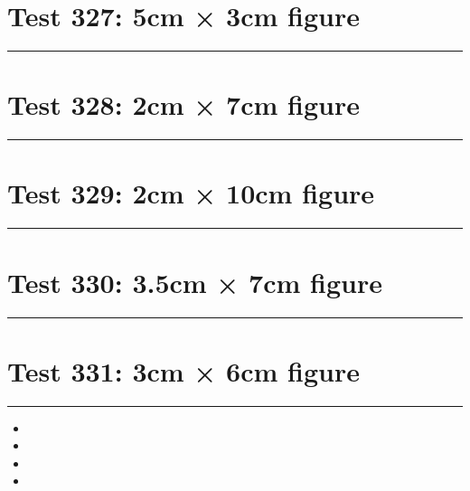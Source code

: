 \documentclass[a4paper,11pt]{article}
\begin{document}
\section*{Test 327: 5cm × 3cm figure}
\begin{swarmwrap}%
  \begin{minipage}[t]{5cm}
    \centering
    \rule{\linewidth}{3cm}
  \end{minipage}%
\end{swarmwrap}%
\swarmwrapnext
\lipsum[112]
\lipsum[113]
\lipsum[114]
\section*{Test 328: 2cm × 7cm figure}
\begin{swarmwrap}%
  \begin{minipage}[t]{2cm}
    \centering
    \rule{\linewidth}{7cm}
  \end{minipage}%
\end{swarmwrap}%
\swarmwrapnext
\lipsum[144]
\lipsum[145]
\lipsum[146]
\lipsum[147]
\section*{Test 329: 2cm × 10cm figure}
\begin{swarmwrap}%
  \begin{minipage}[t]{2cm}
    \centering
    \rule{\linewidth}{10cm}
  \end{minipage}%
\end{swarmwrap}%
\swarmwrapnext
\lipsum[33]
\lipsum[34]
\lipsum[35]
\lipsum[36]
\lipsum[37]
\section*{Test 330: 3.5cm × 7cm figure}
\begin{swarmwrap}%
  \begin{minipage}[t]{3cm}
    \centering
    \rule{\linewidth}{7cm}
  \end{minipage}%
\end{swarmwrap}%
\swarmwrapnext
\lipsum[15]
\lipsum[16]
\lipsum[17]
\lipsum[18]
\lipsum[19]
\lipsum[20]
\section*{Test 331: 3cm × 6cm figure}
\begin{swarmwrap}%
  \begin{minipage}[t]{3cm}
    \centering
    \rule{\linewidth}{6cm}
  \end{minipage}%
\end{swarmwrap}
\begin{itemize}
  \item \swarmwrapnext\lipsum[27][1-4]
  \item \lipsum[29][1-3]
  \item \lipsum[30][1-3]
  \item \lipsum[31][1-3]
\end{itemize}
\end{document}
